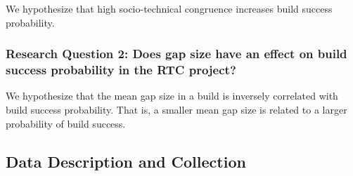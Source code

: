 We hypothesize that high socio-technical congruence increases build success probability.

\subsubsection*{Research Question 2: Does gap size have an effect on build success probability in the RTC project?}

We hypothesize that the mean gap size in a build is inversely correlated with build success probability. That is, a smaller mean gap size is related to a larger probability of build success.

\subsection{Data Description and Collection}
\label{sec:data}

